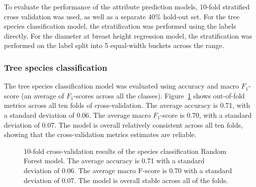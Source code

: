 To evaluate the performance of the attribute prediction models, 10-fold stratified cross validation was used, as well as a separate 40\% hold-out set.
For the tree species classification model, the stratification was performed using the labels directly.
For the diameter at breast height regression model, the stratification was performed on the label split into 5 equal-width buckets across the range.

\subsubsection{Tree species classification}

The tree species classification model was evaluated using accuracy and macro $F_1$-score (an average of $F_1$-scores across all the classes).
Figure~\ref{fig-cv-clf} shows out-of-fold metrics across all ten folds of cross-validation.
The average accuracy is 0.71, with a standard deviation of 0.06.
The average macro $F_1$-score is 0.70, with a standard deviation of 0.07.
The model is overall relatively consistent across all ten folds, showing that the cross-validation metrics estimates are reliable.

\begin{figure}
\caption[Cross-validation results of the species classification Random Forest model]{\label{fig-cv-clf}10-fold cross-validation results of the
species classification Random Forest model. The average accuracy is 0.71
with a standard deviation of 0.06. The average macro F-score is 0.70
with a standard deviation of 0.07. The model is overall stable across
all of the folds.}
\end{figure}

